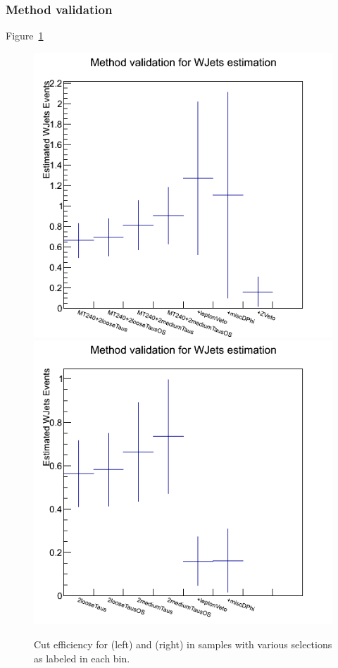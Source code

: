 \subsubsection{Method validation}
Figure~\ref{fig:justification_MT2}  
\begin{figure}[htbp]
\centering
\includegraphics[angle=0,scale=0.35]{TauTauFigs/withMT2GT40.png}
\includegraphics[angle=0,scale=0.35]{TauTauFigs/withMT2GT40ZVeto.png} \\
\caption{Cut efficiency for \mttwo (left) and \SumMT (right) in samples with various selections as labeled in each bin.}
\label{fig:justification_MT2}
\end{figure}
